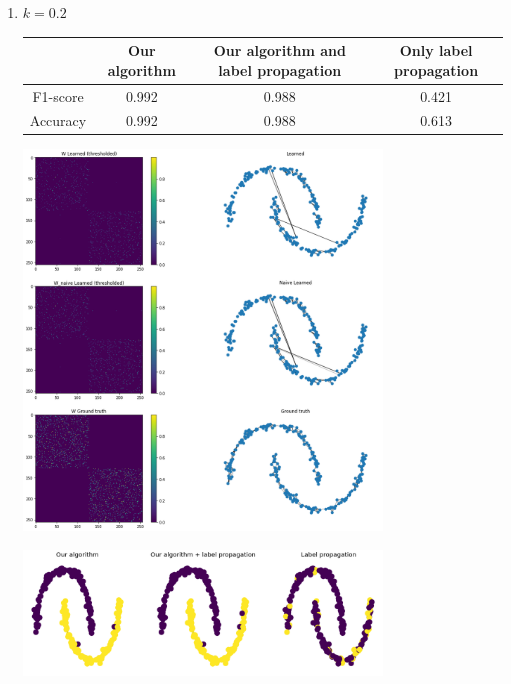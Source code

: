 \documentclass[a4paper]{article}
\begin{document}
\begin{enumerate}
    \item $k = 0.2$
        \begin{center}
            \begin{tabular}{|c|c|c|c|}
                \hline
                    & Our algorithm & Our algorithm and label propagation & Only label propagation\\
                \hline
                F1-score & 0.992 & 0.988 & 0.421 \\
                \hline
                Accuracy & 0.992 & 0.988 & 0.613 \\
                \hline
            \end{tabular}
        \end{center}
        \begin{center}
            \includegraphics[width=0.75\textwidth]{images/p4/20_percent_learned_graphs.png}
        \end{center}
        \begin{center}
            \includegraphics[width=0.75\textwidth]{images/p4/20_percent_predicted_labels.png}
        \end{center}

\end{enumerate}
\end{document}

